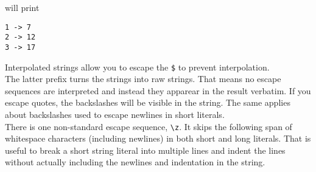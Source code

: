 \documentclass{article}
\begin{document}
will print
\begin{lstlisting}[language=text]
1 -> 7
2 -> 12
3 -> 17
\end{lstlisting}
Interpolated strings allow you to escape the \verb|$| to prevent interpolation.\\
The latter prefix turns the strings into raw strings. That means no escape sequences are interpreted and instead they apparear in the result verbatim. If you escape quotes, the backslashes will be visible in the string. The same applies about backslashes used to escape newlines in short literals.\\
There is one non-standard escape sequence, \verb|\z|. It skips the following span of whitespace characters (including newlines) in both short and long literals. That is useful to break a short string literal into multiple lines and indent the lines without actually including the newlines and indentation in the string.
\end{document}
